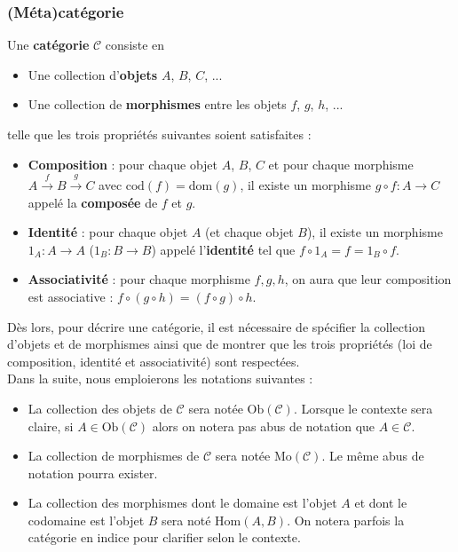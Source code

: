 \documentclass{article}
\begin{document}
\subsubsection{(Méta)catégorie}

\begin{definition}{}
    Une \textbf{catégorie} $\mathcal{C}$ consiste en
    \begin{itemize}[label=\textbullet]
        \item Une collection d'\textbf{objets} $A$, $B$, $C$, ...
        \item Une collection de \textbf{morphismes} entre les objets $f$, $g$, $h$, ...
    \end{itemize}
    telle que les trois propriétés suivantes soient satisfaites :
    \begin{itemize}[label=\textbullet]
        \item \textbf{Composition} : pour chaque objet $A$, $B$, $C$ et pour chaque morphisme $A\xrightarrow{f}B\xrightarrow{g}C$ avec $\text{cod}(f)=\text{dom}(g)$, il existe un morphisme $g\circ f:A\to C$ appelé la \textbf{composée} de $f$ et $g$.
        \item \textbf{Identité} : pour chaque objet $A$ (et chaque objet $B$), il existe un morphisme $1_A:A\to A$ ($1_B:B\to B$) appelé l'\textbf{identité} tel que $f\circ1_A=f=1_B\circ f$.
        \item \textbf{Associativité} : pour chaque morphisme $f, g, h$, on aura que leur composition est associative : $f\circ(g\circ h)=(f\circ g)\circ h$.
    \end{itemize}
\end{definition}

\noindent
Dès lors, pour décrire une catégorie, il est nécessaire de spécifier la collection d'objets et de morphismes ainsi que de montrer que les trois propriétés (loi de composition, identité et associativité) sont respectées.\\

\noindent
Dans la suite, nous emploierons les notations suivantes :

\begin{itemize}[label=\textbullet]
    \item La collection des objets de $\mathcal C$ sera notée $\text{Ob}(\mathcal C)$. Lorsque le contexte sera claire, si $A\in\text{Ob}(\mathcal C)$ alors on notera pas abus de notation que $A\in\mathcal C$.
    \item La collection de morphismes de $\mathcal C$ sera notée $\text{Mo}(\mathcal C)$. Le même abus de notation pourra exister.
    \item La collection des morphismes dont le domaine est l'objet $A$ et dont le codomaine est l'objet $B$ sera noté $\text{Hom}(A, B)$. On notera parfois la catégorie en indice pour clarifier selon le contexte.
\end{itemize}
\end{document}
